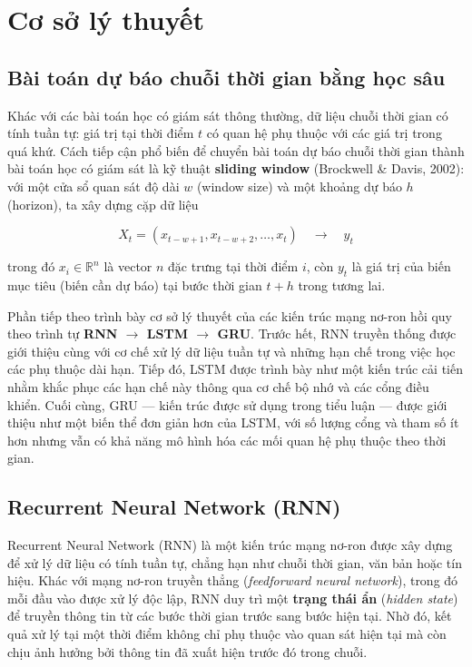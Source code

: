 \documentclass[12pt,oneside]{report}
\begin{document}
\chapter{Cơ sở lý thuyết}

\section{Bài toán dự báo chuỗi thời gian bằng học sâu}

Khác với các bài toán học có giám sát thông thường, dữ liệu chuỗi thời gian có tính tuần tự: giá trị tại thời điểm $t$ có quan hệ phụ thuộc với các giá trị trong quá khứ. Cách tiếp cận phổ biến để chuyển bài toán dự báo chuỗi thời gian thành bài toán học có giám sát là kỹ thuật \textbf{sliding window} (Brockwell \& Davis, 2002): với một cửa sổ quan sát độ dài $w$ (window size) và một khoảng dự báo $h$ (horizon), ta xây dựng cặp dữ liệu

\[
X_t = (x_{t-w+1}, x_{t-w+2}, \dots, x_t) \quad \longrightarrow \quad y_t
\]

trong đó $x_i \in \mathbb{R}^n$ là vector $n$ đặc trưng tại thời điểm $i$, còn $y_t$ là giá trị của biến mục tiêu (biến cần dự báo) tại bước thời gian $t+h$ trong tương lai.

Phần tiếp theo trình bày cơ sở lý thuyết của các kiến trúc mạng nơ-ron hồi quy theo trình tự \textbf{RNN $\rightarrow$ LSTM $\rightarrow$ GRU}. Trước hết, RNN truyền thống được giới thiệu cùng với cơ chế xử lý dữ liệu tuần tự và những hạn chế trong việc học các phụ thuộc dài hạn. Tiếp đó, LSTM được trình bày như một kiến trúc cải tiến nhằm khắc phục các hạn chế này thông qua cơ chế bộ nhớ và các cổng điều khiển. Cuối cùng, GRU --- kiến trúc được sử dụng trong tiểu luận --- được giới thiệu như một biến thể đơn giản hơn của LSTM, với số lượng cổng và tham số ít hơn nhưng vẫn có khả năng mô hình hóa các mối quan hệ phụ thuộc theo thời gian.

\section{Recurrent Neural Network (RNN)}

Recurrent Neural Network (RNN) là một kiến trúc mạng nơ-ron được xây dựng để xử lý dữ liệu có tính tuần tự, chẳng hạn như chuỗi thời gian, văn bản hoặc tín hiệu. Khác với mạng nơ-ron truyền thẳng (\textit{feedforward neural network}), trong đó mỗi đầu vào được xử lý độc lập, RNN duy trì một \textbf{trạng thái ẩn} (\textit{hidden state}) để truyền thông tin từ các bước thời gian trước sang bước hiện tại. Nhờ đó, kết quả xử lý tại một thời điểm không chỉ phụ thuộc vào quan sát hiện tại mà còn chịu ảnh hưởng bởi thông tin đã xuất hiện trước đó trong chuỗi.
\end{document}
